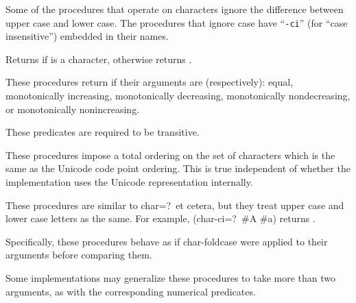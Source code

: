 \vest Some of the procedures that operate on characters ignore the
difference between upper case and lower case.  The procedures that
ignore case have \hbox{``{\tt -ci}''} (for ``case
insensitive'') embedded in their names.


\begin{entry}{%
}

Returns \schtrue{} if  is a character, otherwise returns \schfalse.

\end{entry}


\begin{entry}{%
}

\label{characterequality}

These procedures return \schtrue{} if their arguments are (respectively):
equal, monotonically increasing, monotonically decreasing,
monotonically nondecreasing, or monotonically nonincreasing.

These predicates are required to be transitive.

These procedures impose a total ordering on the set of characters which
is the same as the Unicode code point ordering.  This is true independent
of whether the implementation uses the Unicode representation internally.

\end{entry}


\begin{entry}{%
}

These procedures are similar to {\cf char=?}\ et cetera, but they treat
upper case and lower case letters as the same.  For example, {\cf
(char-ci=?\ \#\backwhack{}A \#\backwhack{}a)} returns \schtrue.

Specifically, these procedures behave as if {\cf char-foldcase} were
applied to their arguments before comparing them.

Some implementations may generalize these procedures to take more than
two arguments, as with the corresponding numerical predicates.

\end{entry}


